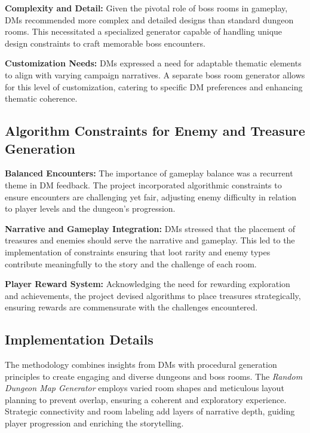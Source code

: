 \documentclass[10pt,twocolumn]{article}
\begin{document}
\textbf{Complexity and Detail:} Given the pivotal role of boss rooms in gameplay, DMs recommended more complex and detailed designs than standard dungeon rooms. This necessitated a specialized generator capable of handling unique design constraints to craft memorable boss encounters.

\textbf{Customization Needs:} DMs expressed a need for adaptable thematic elements to align with varying campaign narratives. A separate boss room generator allows for this level of customization, catering to specific DM preferences and enhancing thematic coherence.

\subsection{Algorithm Constraints for Enemy and Treasure Generation}

\textbf{Balanced Encounters:} The importance of gameplay balance was a recurrent theme in DM feedback. The project incorporated algorithmic constraints to ensure encounters are challenging yet fair, adjusting enemy difficulty in relation to player levels and the dungeon's progression.

\textbf{Narrative and Gameplay Integration:} DMs stressed that the placement of treasures and enemies should serve the narrative and gameplay. This led to the implementation of constraints ensuring that loot rarity and enemy types contribute meaningfully to the story and the challenge of each room.

\textbf{Player Reward System:} Acknowledging the need for rewarding exploration and achievements, the project devised algorithms to place treasures strategically, ensuring rewards are commensurate with the challenges encountered.

\subsection{Implementation Details}

The methodology combines insights from DMs with procedural generation principles to create engaging and diverse dungeons and boss rooms. The \textit{Random Dungeon Map Generator} employs varied room shapes and meticulous layout planning to prevent overlap, ensuring a coherent and exploratory experience. Strategic connectivity and room labeling add layers of narrative depth, guiding player progression and enriching the storytelling.
\end{document}

